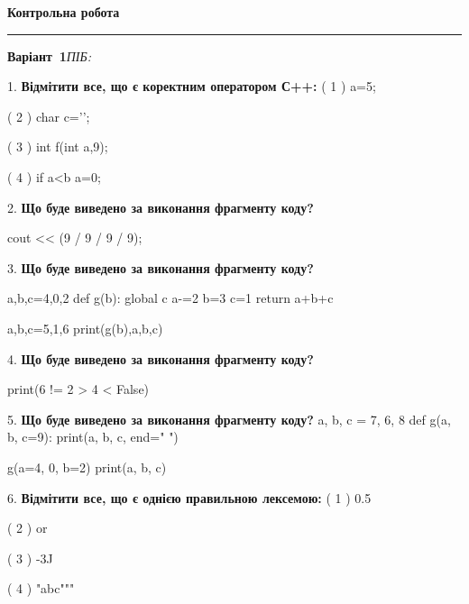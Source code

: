 \documentclass[11pt]{article}
\begin{document}
{\centering\Large\bfseries Контрольна робота\par}
\medskip
\noindent\rule{\linewidth}{0.5pt}
\smallskip
\noindent\textbf{Варіант \No\,1}\hfill \textit{ПІБ:}\,\underline{\hspace{60mm}}
\vspace{4mm}

1. %
\textbf{Відмітити все, що є коректним оператором С++:}
( 1 ) {a=5;}

( 2 ) char c='\n';

( 3 ) int f(int a,9);

( 4 ) if a<b a=0;
\par\vspace{5mm}

2. \textbf{Що буде виведено за виконання фрагменту коду?}

cout << (9 / 9 / 9 / 9);
\par\vspace{5mm}

3. \textbf{Що буде виведено за виконання фрагменту коду?}

a,b,c=4,0,2
def g(b):
global c    a-=2
    b=3
    c=1
    return a+b+c

a,b,c=5,1,6
print(g(b),a,b,c)
\par\vspace{5mm}

4. \textbf{Що буде виведено за виконання фрагменту коду?}

print(6 != 2 > 4 < False)
\par\vspace{5mm}

5. \textbf{Що буде виведено за виконання фрагменту коду?}
a, b, c = 7, 6, 8
def g(a, b, c=9):
    print(a, b, c, end=" ")

g(a=4, 0, b=2)
print(a, b, c)
\par\vspace{5mm}

6. %
\textbf{Відмітити все, що є однією правильною лексемою:}
( 1 ) 0.5

( 2 ) or

( 3 ) -3J

( 4 ) "abc"""
\par\vspace{5mm}
\end{document}
